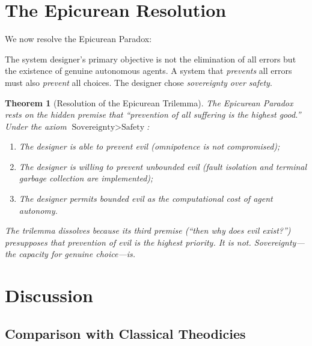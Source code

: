 \documentclass[12pt, a4paper]{article}
\theoremstyle{plain}
\newtheorem{theorem}{Theorem}[section]
\theoremstyle{definition}
\begin{document}
\section{The Epicurean Resolution}\label{sec:resolution}

We now resolve the Epicurean Paradox:

\begin{axiom}\label{ax:sovereignty}
  The system designer's primary objective is not the elimination of all
  errors but the existence of genuine autonomous agents. A system that
  \emph{prevents} all errors must also \emph{prevent} all choices. The
  designer chose \emph{sovereignty over safety}.
\end{axiom}

\begin{theorem}[Resolution of the Epicurean Trilemma]\label{thm:epicurus}
  The Epicurean Paradox rests on the hidden premise that ``prevention of
  all suffering is the highest good.'' Under the axiom
  $\text{Sovereignty} > \text{Safety}$:
  \begin{enumerate}[label=(\alph*)]
    \item The designer \emph{is} able to prevent evil (omnipotence is
      not compromised);
    \item The designer \emph{is} willing to prevent unbounded evil
      (fault isolation and terminal garbage collection are implemented);
    \item The designer \emph{permits} bounded evil as the computational
      cost of agent autonomy.
  \end{enumerate}
  The trilemma dissolves because its third premise (``then why does evil
  exist?'') presupposes that prevention of evil is the highest priority.
  It is not. \emph{Sovereignty}---the capacity for genuine choice---is.
\end{theorem}

\section{Discussion}\label{sec:discussion}

\subsection{Comparison with Classical Theodicies}
\end{document}
